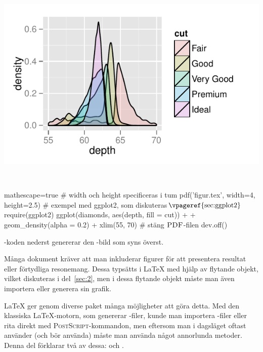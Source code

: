 \documentclass[../../a4.tex]{subfiles}
\begin{document}
\begin{kod}[tbp]
	\centering
	\begin{minipage}{\textwidth}
		\centering
		\includegraphics{chapters/../examples/4/pdfdevice.pdf}
	\end{minipage}
	\\[1ex]
	\begin{minipage}{\textwidth}
		\begin{rcode*}{mathescape=true}
# width och height specificeras i tum
pdf('figur.tex', width=4, height=2.5)
# exempel med ggplot2, som diskuteras$\text{\vpageref{sec:ggplot2}}$
require(ggplot2)
ggplot(diamonds, aes(depth, fill = cut)) +
  + geom_density(alpha = 0.2) + xlim(55, 70)
# stäng $\text{\textsc{PDF}}$-filen
dev.off()
		\end{rcode*}
	\end{minipage}
	\caption{\Rlogo-koden nederst genererar den \PDF-bild som
	syns överst.}
	\label{ex:pdfdevice}
\end{kod}


\iffalse
Många dokument kräver att man inkluderar figurer för att presentera
resultat eller förtydliga resonemang. Dessa typsätts i \LaTeX{} med hjälp
av flytande objekt, vilket diskuteras i del~\ref{sec:2}, men i dessa
flytande objekt måste man även importera eller generera sin grafik.

\LaTeX{} ger genom diverse paket många möjligheter att göra detta. Med den
klassiska \LaTeX{}-motorn, som genererar \DVI-filer, kunde man importera
\EPS-filer eller rita direkt med \textsc{PostScript}-kommandon, men
eftersom man i dagsläget oftast använder (och bör använda) \pdfLaTeX{}
måste man använda något annorlunda metoder. Denna del förklarar två av
dessa:  och \PGFTikZ.
\end{document}
